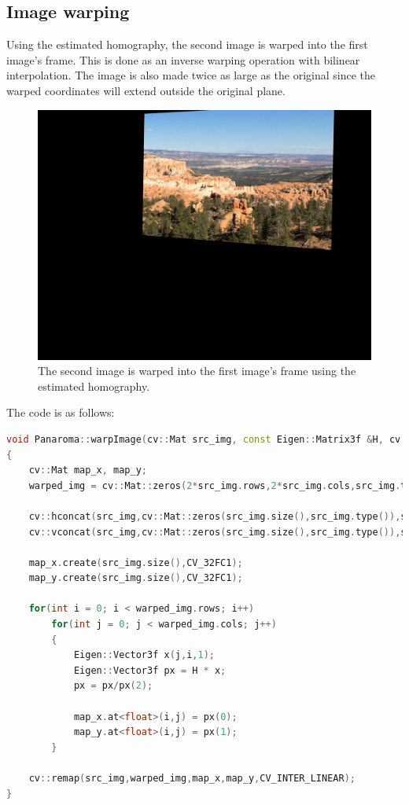 \documentclass[a4paper,11]{article}
\begin{document}
    \vspace{1em}
    
  \subsection{Image warping}
  
  Using the estimated homography, the second image is warped into the first image's frame. This is done as an inverse warping operation with bilinear interpolation. The image is also made twice as large as the original since the warped coordinates will extend outside the original plane.
  
    \begin{figure}[H]
    \centering
    \includegraphics[scale=0.15]{warped-eg}
    \caption{The second image is warped into the first image's frame using the estimated homography.}
  \end{figure}
  
    \noindent The code is as follows:
    \begin{lstlisting}[language=C++]
void Panaroma::warpImage(cv::Mat src_img, const Eigen::Matrix3f &H, cv::Mat &warped_img)
{
	cv::Mat map_x, map_y;
	warped_img = cv::Mat::zeros(2*src_img.rows,2*src_img.cols,src_img.type());
	
	cv::hconcat(src_img,cv::Mat::zeros(src_img.size(),src_img.type()),src_img);
	cv::vconcat(src_img,cv::Mat::zeros(src_img.size(),src_img.type()),src_img);

	map_x.create(src_img.size(),CV_32FC1);
	map_y.create(src_img.size(),CV_32FC1);
	
	for(int i = 0; i < warped_img.rows; i++)
		for(int j = 0; j < warped_img.cols; j++)
		{
			Eigen::Vector3f x(j,i,1);
			Eigen::Vector3f px = H * x;
			px = px/px(2);

			map_x.at<float>(i,j) = px(0);
			map_y.at<float>(i,j) = px(1);
		}

	cv::remap(src_img,warped_img,map_x,map_y,CV_INTER_LINEAR);
} 
    \end{lstlisting}
    \vspace{1em}
\end{document}
